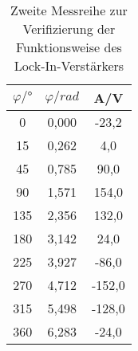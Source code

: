 \begin{table}[h!]
  \centering
  \caption{Zweite Messreihe zur Verifizierung der Funktionsweise des Lock-In-Verstärkers}
  \label{tab:rausch}
  \begin{tabular}{c c c}
    \toprule
    $\varphi/°$ & $\varphi/rad$ &	 A/V	   \\
    \midrule
    0   & 0,000  & -23,2  \\
    15  & 0,262  &  4,0   \\
    45  & 0,785  &  90,0  \\
    90  & 1,571  &  154,0 \\
    135 & 2,356	&  132,0 \\
    180 & 3,142	&  24,0  \\
    225 & 3,927	& -86,0  \\
    270 & 4,712	& -152,0 \\
    315 & 5,498	& -128,0 \\
    360 & 6,283	& -24,0  \\
    \bottomrule
  \end{tabular}
\end{table}
